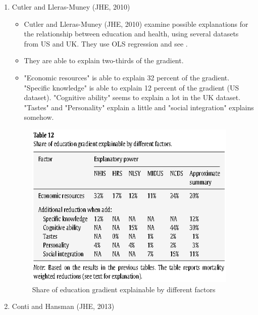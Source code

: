 \begin{enumerate}
    \item Cutler and Lleras-Muney (JHE, 2010)

\begin{itemize}

        \item Cutler and Lleras-Muney (JHE, 2010) examine possible explanations for the relationship between education and health, using several datasets from US and UK. They use OLS regression and see .
        \item They are able to explain two-thirds of the gradient.
        \item "Economic resources" is able to explain 32 percent of the gradient. "Specific knowledge" is able to explain 12 percent of the gradient (US dataset). "Cognitive ability" seems to explain a lot in the UK dataset. "Tastes" and "Personality" explain a little and "social integration" explains somehow.
\end{itemize}
        
\begin{figure}[H]%
                \centering
                \includegraphics[width=4in]{images/ch3/41.png}
                \caption{Share of education gradient explainable by different factors}
            \end{figure}
            
\item Conti and Hansman (JHE, 2013)
            

\end{enumerate}

